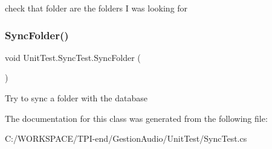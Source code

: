 check that folder are the folders I was looking for 

\mbox{\label{class_unit_test_1_1_sync_test_a988e686b462be304ca52e67b9f1876a3}} 
\subsubsection{\texorpdfstring{Sync\+Folder()}{SyncFolder()}}
{\footnotesize\ttfamily void Unit\+Test.\+Sync\+Test.\+Sync\+Folder (\begin{DoxyParamCaption}{ }\end{DoxyParamCaption})}



Try to sync a folder with the database 



The documentation for this class was generated from the following file\+:\begin{DoxyCompactItemize}
\item 
C\+:/\+W\+O\+R\+K\+S\+P\+A\+C\+E/\+T\+P\+I-\/end/\+Gestion\+Audio/\+Unit\+Test/Sync\+Test.\+cs\end{DoxyCompactItemize}
